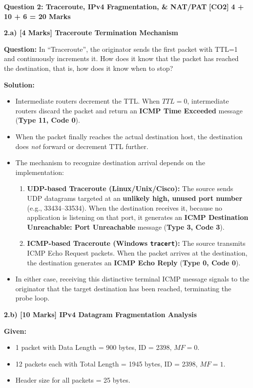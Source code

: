 \documentclass[11pt,a4paper]{article}
\newcommand{\questionheader}[3]{
    \vspace{0.35cm}
    \noindent\colorbox{qboxbg}{
        \parbox{\dimexpr\textwidth-2\fboxsep\relax}{
            \textbf{\textcolor{primary}{\large #1}} \hfill \textbf{\textcolor{accent}{[#2]}} \hfill \textbf{\textcolor{secondary}{#3 Marks}}
        }
    }
    \vspace{0.15cm}
}
\begin{document}
\newpage
\questionheader{Question 2: Traceroute, IPv4 Fragmentation, \& NAT/PAT}{CO2}{4 + 10 + 6 = 20}

\textbf{2.a) [4 Marks] Traceroute Termination Mechanism}

\textbf{Question:} In ``Traceroute'', the originator sends the first packet with TTL=1 and continuously increments it. How does it know that the packet has reached the destination, that is, how does it know when to stop?

\textbf{Solution:}
\begin{itemize}
    \item Intermediate routers decrement the TTL. When $TTL = 0$, intermediate routers discard the packet and return an \textbf{ICMP Time Exceeded} message (\textbf{Type 11, Code 0}).
    \item When the packet finally reaches the actual destination host, the destination does \emph{not} forward or decrement TTL further.
    \item The mechanism to recognize destination arrival depends on the implementation:
    \begin{enumerate}
        \item \textbf{UDP-based Traceroute (Linux/Unix/Cisco):} The source sends UDP datagrams targeted at an \textbf{unlikely high, unused port number} (e.g., 33434--33534). When the destination receives it, because no application is listening on that port, it generates an \textbf{ICMP Destination Unreachable: Port Unreachable} message (\textbf{Type 3, Code 3}).
        \item \textbf{ICMP-based Traceroute (Windows \texttt{tracert}):} The source transmits ICMP Echo Request packets. When the packet arrives at the destination, the destination generates an \textbf{ICMP Echo Reply} (\textbf{Type 0, Code 0}).
    \end{enumerate}
    \item In either case, receiving this distinctive terminal ICMP message signals to the originator that the target destination has been reached, terminating the probe loop.
\end{itemize}

\vspace{0.2cm}
\textbf{2.b) [10 Marks] IPv4 Datagram Fragmentation Analysis}

\textbf{Given:}
\begin{itemize}
    \item 1 packet with Data Length = 900 bytes, ID = 2398, $MF = 0$.
    \item 12 packets each with Total Length = 1945 bytes, ID = 2398, $MF = 1$.
    \item Header size for all packets = 25 bytes.
\end{itemize}
\end{document}
